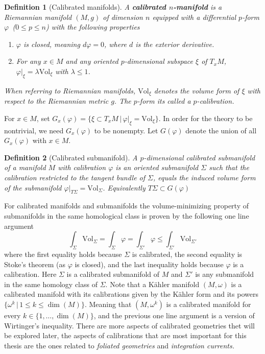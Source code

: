 \documentclass[12pt,twoside,a4paper]{report}
\newtheorem{definition}{Definition}[section]
\newcommand{\sig}{\ensuremath{\Sigma}}
\begin{document}
  \begin{definition}[Calibrated manifolds] A \textbf{calibrated $n$-manifold} is a Riemannian manifold $(M, g)$ of dimension $n$ equipped with a differential $p$-form $\varphi\,$  ($0 \leq {p} \leq{n}$) with the following properties
  \begin{enumerate}
  \item $\varphi$ is closed, meaning $d\varphi = 0$, where $d$ is the exterior derivative.
  \item For any $x \in M$ and any oriented $p$-dimensional subspace $\xi$ of $T_{x}M$, $\varphi|_{\xi} = \lambda \textrm{Vol}_{\xi}$ with $\lambda\leq 1$.
  \end{enumerate}
  When referring to Riemannian manifolds, $\textrm{Vol}_{\xi}$ denotes the volume form of  $\xi$ with respect to the Riemannian metric $g$. The $p$-form its called a $p$-\emph{calibration}.
  \end{definition}
  For $x\in M$, set $G_{x}(\varphi) = \{ \xi \subset T_{x}M\,\vert\,  \varphi|_{\xi} = \textrm{Vol}_{\xi} \}$. In order for the theory to be nontrivial, we need $G_x(\varphi)$ to be nonempty. Let $G(\varphi)$ denote the union of all $G_x(\varphi)$ with $x\in M$.
  \begin{definition}[Calibrated submanifold]
  A $p$-dimensional calibrated submanifold of a manifold $M$ with calibration $\varphi$ is an oriented submanifold $\sig$ such that the calibration restricted to the tangent bundle of $\Sigma$, equals the induced volume form of the submanifold $\varphi|_{T\Sigma}=\textrm{Vol}_{\Sigma}$. Equivalently $T\Sigma\subset G(\varphi)$
  \end{definition}
  For calibrated manifolds and submanifolds the volume-minimizing property of submanifolds in the same homological class is proven by the following one line argument
  \begin{equation}\label{oneline}
    \int_{\sig}\mathrm{Vol}_{\Sigma}=\int_{\Sigma}\varphi =\int_{\Sigma'}\varphi \leq \int_{\Sigma'}\mathrm{Vol}_{\Sigma'}
  \end{equation}
  where the first equality holds because $\sig$ is calibrated, the second equality is Stoke's theorem (as $\varphi$ is closed), and the last inequality holds because $ \varphi$ is a calibration.
  Here $\sig$ is a calibrated submanifold of $M$ and $\Sigma'$ is any submanifold in the same homology class of $\Sigma$. Note that a Kähler manifold $(M,\omega)$ is a calibrated manifold with its calibrations given by the Kähler form and its powers $\{\omega^{k}\,\vert\, 1\leq k\leq \dim(M)\}$. Meaning that $(M,\omega^{k})$ is a calibrated manifold for every $k\in\{1,\dots,\dim(M)\}$, and the previous one line argument is a version of Wirtinger's inequality. There are more aspects of calibrated geometries thet will be explored later, the aspects of calibrations that are most important for this thesis are the ones related to \emph{foliated geometries} and \emph{integration currents.}
\end{document}

